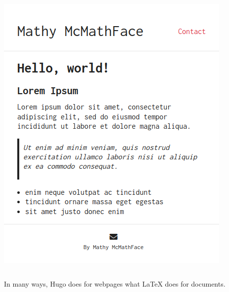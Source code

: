 \begin{frame}
\begin{columns}
\begin{column}{.45\textwidth}
            \includegraphics[width=\textwidth]{images/rendered_markdown.png}
        \end{column}
    \end{columns}

    \pause
    \vfill

    In many ways, Hugo does for webpages what \LaTeX \: does for documents.
    
\end{frame}